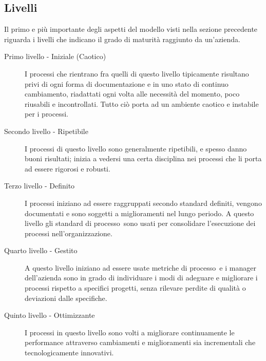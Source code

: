 \documentclass[../PianoDiQualifica.tex]{subfiles}
\begin{document}
\begin{appendices}
	\subsection{Livelli}
	Il primo e più importante degli aspetti del modello visti nella sezione precedente riguarda i livelli che indicano il grado di maturità raggiunto da un'azienda.
	\begin{description}
		\item[Primo livello - Iniziale (Caotico)] I processi che rientrano fra quelli di questo livello tipicamente risultano privi di ogni forma di documentazione e in uno stato di continuo cambiamento, riadattati ogni volta alle necessità del momento, poco riusabili e incontrollati. Tutto ciò porta ad un ambiente caotico e instabile per i processi.
		\item[Secondo livello - Ripetibile] I processi di questo livello sono generalmente ripetibili, e spesso danno buoni risultati; inizia a vedersi una certa disciplina nei processi che li porta ad essere rigorosi e robusti.
		\item[Terzo livello - Definito] I processi iniziano ad essere raggruppati secondo standard definiti, vengono documentati e sono soggetti a miglioramenti nel lungo periodo. A questo livello gli standard di processo\g\ sono usati per consolidare l'esecuzione dei processi nell'organizzazione.
		\item[Quarto livello - Gestito] A questo livello iniziano ad essere usate metriche di processo\g\ e i manager dell'azienda sono in grado di individuare i modi di adeguare e migliorare i processi rispetto a specifici progetti, senza rilevare perdite di qualità o deviazioni dalle specifiche.
		\item[Quinto livello - Ottimizzante] I processi in questo livello sono volti a migliorare continuamente le performance attraverso cambiamenti e miglioramenti sia incrementali che tecnologicamente innovativi.
	\end{description}
\end{appendices}
\end{document}
